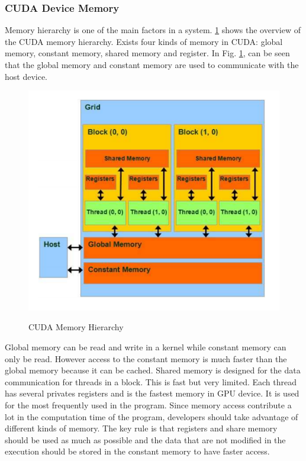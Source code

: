 \documentclass[Ingles]{ic-tese-v1}
\begin{document}
\subsubsection{CUDA Device Memory}
\label{CUDA Device Memory}
Memory hierarchy is one of the main factors in a system. \ref{fig:cudamemory} shows the overview of the CUDA memory hierarchy. Exists four kinds of memory in CUDA: global
memory, constant memory, shared memory and register. In Fig. \ref{fig:cudamemory}, can be seen that the global memory and constant memory are used to communicate with the host device.\\

\begin{figure}[t]
	\caption{CUDA Memory Hierarchy}
	\centering
	\includegraphics[scale=0.70]{images/cuda_memory.png}
	\label{fig:cudamemory}
\end{figure}

Global memory can be read and write in a kernel while constant memory can only be
read. However access to the constant memory is much faster than the global memory because it can be cached. Shared memory is designed for the data communication for
threads in a block. This is fast but very limited. Each thread has several privates registers and is the fastest memory in GPU device. It is used for the most frequently used in the program. Since memory access contribute a lot in the computation time of the program, developers should take advantage of different kinds of memory. The key rule is that registers and share memory should be used as much as possible and the data that are not modified in the execution should be stored in the constant memory to have faster access.
\end{document}

